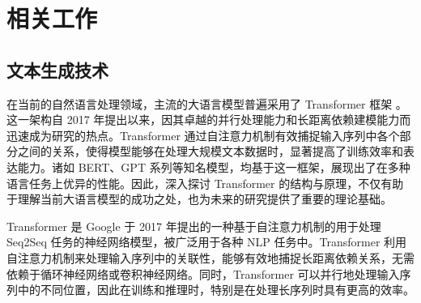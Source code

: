 

\chapter{相关工作}
\label{chap:related works}

\section{文本生成技术}
\label{sec:rw-lm}

在当前的自然语言处理领域，主流的大语言模型普遍采用了 Transformer 框架 \cite{transformer}。这一架构自 2017 年提出以来，因其卓越的并行处理能力和长距离依赖建模能力而迅速成为研究的热点。Transformer 通过自注意力机制有效捕捉输入序列中各个部分之间的关系，使得模型能够在处理大规模文本数据时，显著提高了训练效率和表达能力。诸如 BERT、GPT 系列等知名模型，均基于这一框架，展现出了在多种语言任务上优异的性能。因此，深入探讨 Transformer 的结构与原理，不仅有助于理解当前大语言模型的成功之处，也为未来的研究提供了重要的理论基础。

Transformer 是 Google 于 2017 年提出的一种基于自注意力机制的用于处理 Seq2Seq 任务的神经网络模型，被广泛用于各种 NLP 任务中。Transformer 利用自注意力机制来处理输入序列中的关联性，能够有效地捕捉长距离依赖关系，无需依赖于循环神经网络或卷积神经网络。同时，Transformer 可以并行地处理输入序列中的不同位置，因此在训练和推理时，特别是在处理长序列时具有更高的效率。

